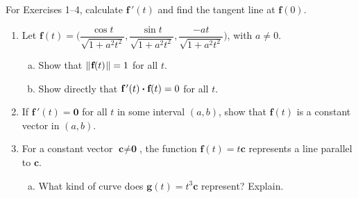 \startexercises\label{sec1dot8}
\par\noindent For Exercises 1--4, calculate $\textbf{f}\,'(t)$ and find the tangent line at $\textbf{f}(0)$.
\begin{enumerate}[\bfseries 1.]
\par\noindent For Exercises 5--6, find the velocity $\textbf{v}(t)$ and acceleration $\textbf{a}(t)$ of an object
with the given position vector $\textbf{r}(t)$.
[{[\bfseries 1.]}]
[{[\bfseries 1.]}]
 \item Let $\textbf{f}(t) = \biggl( \dfrac{\cos t}{\sqrt{1 + a^2 t^2}},\dfrac{\sin t}{\sqrt{1 + a^2 t^2}},
  \dfrac{-at}{\sqrt{1 + a^2 t^2}} \biggr)$, with $a \ne 0$.
  \begin{enumerate}[(a)]
   \item Show that $\lVert\mspace{1mu}\textbf{f}(t)\mspace{1mu}\rVert = 1$ for all $t$.
   \item Show directly that $\textbf{f}\,'(t) \bm{\cdot} \textbf{f}(t) = 0$ for all $t$.
  \end{enumerate}
 \item If $\textbf{f}\,'(t) = \textbf{0}$ for all $t$ in some interval $(a,b)$, show that $\textbf{f}(t)$ is
  a constant vector in $(a,b)$.
 \item For a constant vector $\textbf{c} \ne \textbf{0}$, the function $\textbf{f}(t) = t\textbf{c}$ represents a line
  parallel to $\textbf{c}$.
  \begin{enumerate}[(a)]
   \item What kind of curve does $\textbf{g}(t) = t^3\textbf{c}$ represent? Explain.

\end{enumerate}
\end{enumerate}
